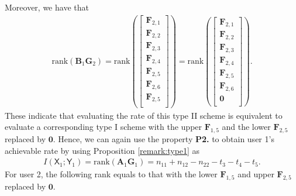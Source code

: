 \documentclass[12pt, draftclsnofoot, onecolumn]{IEEEtran}
\newcommand{\msf}[1]{\mathsf{#1}}
\theoremstyle{definition}
\begin{document}
Moreover, we have that
\begin{align}
\text{rank}(\boldsymbol{B}_1\boldsymbol{G}_2) = \text{rank}\left(\begin{bmatrix}
\boldsymbol{F}_{2,1}\\
\boldsymbol{F}_{2,2}\\
\boldsymbol{F}_{2,3} \\
\boldsymbol{F}_{2,4}\\
\boldsymbol{F}_{2,5} \\
\boldsymbol{F}_{2,6} \\
\boldsymbol{F}_{2,5} \\
\end{bmatrix}
\right)
= \text{rank}\left(\begin{bmatrix}
\boldsymbol{F}_{2,1}\\
\boldsymbol{F}_{2,2}\\
\boldsymbol{F}_{2,3} \\
\boldsymbol{F}_{2,4}\\
\boldsymbol{F}_{2,5} \\
\boldsymbol{F}_{2,6} \\
\boldsymbol{0} \\
\end{bmatrix}
\right).
\end{align}
These indicate that evaluating the rate of this type II scheme is equivalent to evaluate a corresponding type I scheme with the upper $\boldsymbol{F}_{1,5}$ and the lower $\boldsymbol{F}_{2,5}$ replaced by $\boldsymbol{0}$. Hence, we can again use the property \textbf{P2.} to obtain user 1's achievable rate by using Proposition \ref{remark:type1} as
\begin{align}
I(\msf{X}_1;\msf{Y}_1) = \text{rank}(\boldsymbol{A}_1\boldsymbol{G}_1)= n_{11}+n_{12}-n_{22}-t_3-t_4-t_5.
\end{align}
For user 2, the following rank equals to that with the lower $\boldsymbol{F}_{1,5}$ and upper $\boldsymbol{F}_{2,5}$ replaced by $\boldsymbol{0}$.
\vspace{-0.4mm}
\end{document}
